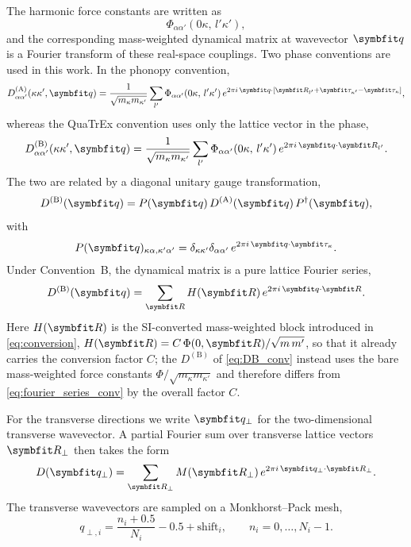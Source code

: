 The harmonic force constants are written as
\begin{equation}
  \Phi_{\alpha\alpha'}(0\kappa,\,l'\kappa'),
\end{equation}
and the corresponding mass-weighted dynamical matrix at wavevector
$\vq$ is a Fourier transform of these real-space couplings.
Two phase conventions are used in this work.  In the phonopy
convention,
\begin{equation}\label{eq:DA_conv}
  D_{\alpha\alpha'}^{(\mathrm{A})}(\kappa\kappa',\vq)
  = \frac{1}{\sqrt{m_\kappa m_{\kappa'}}}
    \sum_{l'} \Phi_{\alpha\alpha'}(0\kappa,\,l'\kappa')\,
    e^{2\pi i\,\vq\cdot
      [\vR_{l'} + \vc{\tau}_{\kappa'} - \vc{\tau}_\kappa]},
\end{equation}
whereas the QuaTrEx convention uses only the lattice vector in the
phase,
\begin{equation}\label{eq:DB_conv}
  D_{\alpha\alpha'}^{(\mathrm{B})}(\kappa\kappa',\vq)
  = \frac{1}{\sqrt{m_\kappa m_{\kappa'}}}
    \sum_{l'} \Phi_{\alpha\alpha'}(0\kappa,\,l'\kappa')\,
    e^{2\pi i\,\vq\cdot\vR_{l'}}.
\end{equation}
The two are related by a diagonal unitary gauge transformation,
\begin{equation}\label{eq:gauge_conv}
  D^{(\mathrm{B})}(\vq)
  = P(\vq)\,D^{(\mathrm{A})}(\vq)\,P^\dagger(\vq),
\end{equation}
with
\begin{equation}
  P(\vq)_{\kappa\alpha,\kappa'\alpha'}
  = \delta_{\kappa\kappa'}\delta_{\alpha\alpha'}\,
    e^{2\pi i\,\vq\cdot\vc{\tau}_\kappa}.
\end{equation}
Under Convention~B, the dynamical matrix is a pure lattice Fourier
series,
\begin{equation}\label{eq:fourier_series_conv}
  D^{(\mathrm{B})}(\vq)
  = \sum_{\vR} H(\vR)\,e^{2\pi i\,\vq\cdot\vR}.
\end{equation}
Here $H(\vR)$ is the SI-converted mass-weighted block introduced in
\cref{eq:conversion}, $H(\vR) = C\,\Phi(0,\vR)/\sqrt{m\,m'}$, so that it
already carries the conversion factor $C$; the $D^{(\mathrm{B})}$ of
\cref{eq:DB_conv} instead uses the bare mass-weighted force constants
$\Phi/\sqrt{m_\kappa m_{\kappa'}}$ and therefore differs from
\cref{eq:fourier_series_conv} by the overall factor $C$.

For the transverse directions we write $\vq_\perp$ for the
two-dimensional transverse wavevector.  A partial Fourier sum over
transverse lattice vectors $\vR_\perp$ then takes the form
\begin{equation}
  D(\vq_\perp)
  = \sum_{\vR_\perp} M(\vR_\perp)\,
    e^{2\pi i\,\vq_\perp\cdot\vR_\perp}.
\end{equation}
The transverse wavevectors are sampled on a Monkhorst--Pack mesh,
\begin{equation}
  q_{\perp,i} = \frac{n_i + 0.5}{N_i} - 0.5 + \mathrm{shift}_i,
  \qquad n_i = 0,\ldots,N_i-1.
\end{equation}


